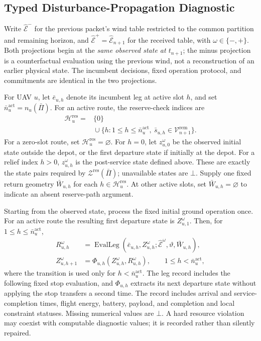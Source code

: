 \subsection{Typed Disturbance-Propagation Diagnostic}
\label{subsec:propagation_diagnostic}

Write $\widehat{\mathcal E}^{-}$ for the previous packet's wind table
restricted to the common partition and remaining horizon, and
$\widehat{\mathcal E}^{+}=\widehat{\mathcal E}_{n+1}$ for the received table, with
$\omega\in\{-,+\}$. Both projections begin at the \emph{same observed
state at $t_{n+1}$}; the minus projection is a counterfactual evaluation
using the previous wind, not a reconstruction of an earlier physical
state. The incumbent decisions, fixed operation protocol, and commitments
are identical in the two projections.

For UAV $u$, let $\bar e_{u,h}$ denote its incumbent leg at active slot
$h$, and set $\bar n_u^{\mathrm{act}}=n_u(\bar\Pi)$.
For an active route, the reserve-check indices are
\begin{equation}
\begin{split}
\mathcal H_u^{\mathrm{res}}
={}&\{0\}\\
&{}\cup\{h:1\le h\le\bar n_u^{\mathrm{act}},\
\bar s_{u,h}\in\mathcal V_{n+1}^{\mathrm{rem}}\}.
\end{split}
\label{eq:diagnostic_reserve_indices}
\end{equation}
For a zero-slot route, set $\mathcal H_u^{\mathrm{res}}=\varnothing$.
For $h=0$, let $z_{u,0}^{\omega}$ be the observed initial state outside
the depot, or the first departure state if initially at the depot.
For a relief index $h>0$, $z_{u,h}^{\omega}$ is the post-service state
defined above. These are exactly the state pairs required by
$\mathcal Z^{\mathrm{res}}(\bar\Pi)$; unavailable states are $\bot$.
Supply one fixed return geometry $\bar W_{u,h}$ for each
$h\in\mathcal H_u^{\mathrm{res}}$. At other active slots, set
$\bar W_{u,h}=\varnothing$ to indicate an absent reserve-path argument.

Starting from the observed state, process the fixed initial ground
operation once. For an active route the resulting first departure state is
$Z_{u,1}^{\omega}$. Then, for $1\le h\le\bar n_u^{\mathrm{act}}$,
\begin{align}
R_{u,h}^{\omega}
&=\operatorname{EvalLeg}
 (\bar e_{u,h},Z_{u,h}^{\omega};\widehat{\mathcal E}^{\omega},\vartheta,
 \bar W_{u,h}),
\label{eq:two_packet_projection}\\
Z_{u,h+1}^{\omega}
&=\Phi_{u,h}(Z_{u,h}^{\omega},R_{u,h}^{\omega}),
\qquad 1\le h<\bar n_u^{\mathrm{act}},
\label{eq:projection_transition}
\end{align}
where the transition is used only for $h<\bar n_u^{\mathrm{act}}$.
The leg record includes the
following fixed stop evaluation, and $\Phi_{u,h}$ extracts its next
departure state without applying the stop transfers a second time.
The record includes arrival and
service-completion times, flight energy, battery, payload, and completion
and local constraint statuses. Missing numerical values are $\bot$.
A hard resource violation may coexist with computable diagnostic values;
it is recorded rather than silently repaired.

